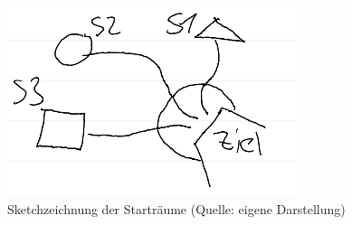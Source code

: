 \begin{figure}[ht]
\centering
\includegraphics[width=1\linewidth]{content/pictures/Startplaces_Sketch.png}
\caption{Sketchzeichnung der Starträume (Quelle: eigene Darstellung)}
\label{fig:sketch-starterrooms}
\end{figure}



